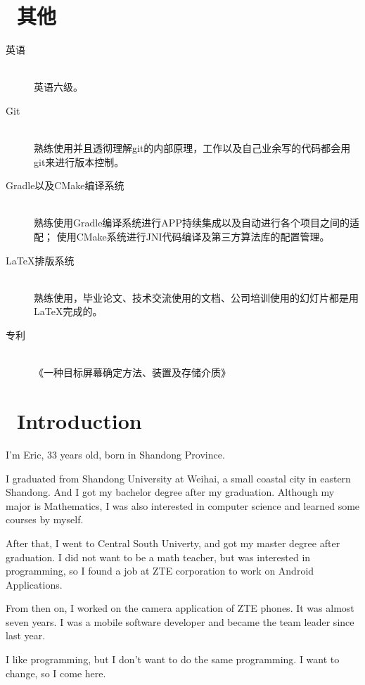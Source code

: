 \documentclass{resume}
\begin{document}
\section{\faInfo\ 其他}
\begin{description}
  \item[英语] \ \\ 英语六级。
  \item[Git] \ \\ 熟练使用并且透彻理解git的内部原理，工作以及自己业余写的代码都会用git来进行版本控制。
  \item[Gradle以及CMake编译系统] \ \\ 熟练使用Gradle编译系统进行APP持续集成以及自动进行各个项目之间的适配；
    使用CMake系统进行JNI代码编译及第三方算法库的配置管理。
  \item[\LaTeX{}排版系统] \ \\ 熟练使用，毕业论文、技术交流使用的文档、公司培训使用的幻灯片都是用\LaTeX{}完成的。
  \item[专利] \ \\ 《一种目标屏幕确定方法、装置及存储介质》
\end{description}



\section{\faInfo\ Introduction}
I'm Eric, 33 years old, born in Shandong Province.

I graduated from Shandong University at Weihai, a small coastal city in eastern Shandong. And I got my bachelor degree after my graduation. Although my major is Mathematics, I was also interested in computer science and learned some courses by myself.

After that, I went to Central South Univerty, and got my master degree after graduation. I did not want to be a math teacher, but was interested in programming, so I found a job at ZTE corporation to work on Android Applications.

From then on, I worked on the camera application of ZTE phones. It was almost seven years. I was a mobile software developer and became the team leader since last year.

I like programming, but I don't want to do the same programming. I want to change, so I come here.


%
%
\end{document}
